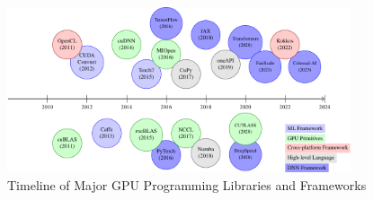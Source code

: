 \begin{figure}
    \centering
    \includegraphics[width=0.9\textwidth]{figures/timeline}
    \caption{Timeline of Major GPU Programming Libraries and Frameworks}
    \label{fig:gpu_timeline}
\end{figure} 